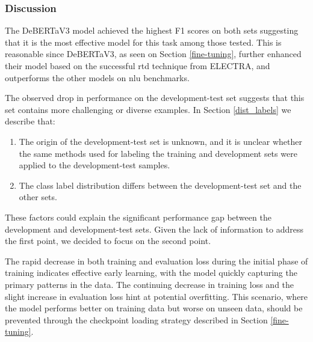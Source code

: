 

\subsubsection{Discussion}
The DeBERTaV3 model achieved the highest F1 scores on both sets suggesting that it is the most effective model for this task among those tested. This is reasonable since DeBERTaV3, as seen on Section \ref{fine-tuning}, further enhanced their model based on the successful \gls{rtd} technique from ELECTRA, and outperforms the other models on \gls{nlu} benchmarks.

The observed drop in performance on the development-test set suggests that this set contains more challenging or diverse examples. In Section \ref{dist_labels} we describe that:
\begin{enumerate}
    \item The origin of the development-test set is unknown, and it is unclear whether the same methods used for labeling the training and development sets were applied to the development-test samples.
    \item The class label distribution differs between the development-test set and the other sets.
\end{enumerate}
These factors could explain the significant performance gap between the development and development-test sets. Given the lack of information to address the first point, we decided to focus on the second point.

The rapid decrease in both training and evaluation loss during the initial phase of training indicates effective early learning, with the model quickly capturing the primary patterns in the data. The continuing decrease in training loss and the slight increase in evaluation loss hint at potential overfitting. This scenario, where the model performs better on training data but worse on unseen data, should be prevented through the checkpoint loading strategy described in Section \ref{fine-tuning}.

